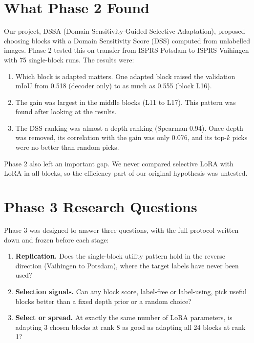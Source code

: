 \documentclass[11pt,a4paper]{report}
\begin{document}
\section{What Phase 2 Found}

Our project, DSSA (Domain Sensitivity-Guided Selective Adaptation), proposed choosing blocks with a Domain Sensitivity Score (DSS) computed from unlabelled images. Phase 2 tested this on transfer from ISPRS Potsdam to ISPRS Vaihingen with 75 single-block runs. The results were:

\begin{enumerate}
    \item Which block is adapted matters. One adapted block raised the validation mIoU from 0.518 (decoder only) to as much as 0.555 (block L16).
    \item The gain was largest in the middle blocks (L11 to L17). This pattern was found after looking at the results.
    \item The DSS ranking was almost a depth ranking (Spearman 0.94). Once depth was removed, its correlation with the gain was only 0.076, and its top-$k$ picks were no better than random picks.
\end{enumerate}

Phase 2 also left an important gap. We never compared selective LoRA with LoRA in all blocks, so the efficiency part of our original hypothesis was untested.

\section{Phase 3 Research Questions}

Phase 3 was designed to answer three questions, with the full protocol written down and frozen before each stage:

\begin{enumerate}
    \item \textbf{Replication.} Does the single-block utility pattern hold in the reverse direction (Vaihingen to Potsdam), where the target labels have never been used?
    \item \textbf{Selection signals.} Can any block score, label-free or label-using, pick useful blocks better than a fixed depth prior or a random choice?
    \item \textbf{Select or spread.} At exactly the same number of LoRA parameters, is adapting 3 chosen blocks at rank 8 as good as adapting all 24 blocks at rank 1?
\end{enumerate}
\end{document}
